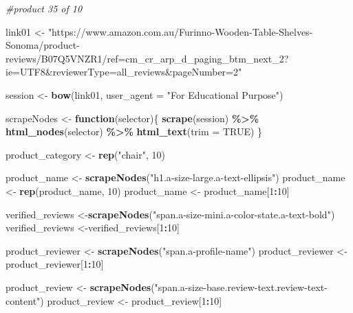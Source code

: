 \documentclass[
]{article}
\newenvironment{Shaded}{\begin{snugshade}}{\end{snugshade}}
\newcommand{\AttributeTok}[1]{\textcolor[rgb]{0.13,0.29,0.53}{#1}}
\newcommand{\CommentTok}[1]{\textcolor[rgb]{0.56,0.35,0.01}{\textit{#1}}}
\newcommand{\ConstantTok}[1]{\textcolor[rgb]{0.56,0.35,0.01}{#1}}
\newcommand{\ControlFlowTok}[1]{\textcolor[rgb]{0.13,0.29,0.53}{\textbf{#1}}}
\newcommand{\DecValTok}[1]{\textcolor[rgb]{0.00,0.00,0.81}{#1}}
\newcommand{\FunctionTok}[1]{\textcolor[rgb]{0.13,0.29,0.53}{\textbf{#1}}}
\newcommand{\NormalTok}[1]{#1}
\newcommand{\OtherTok}[1]{\textcolor[rgb]{0.56,0.35,0.01}{#1}}
\newcommand{\SpecialCharTok}[1]{\textcolor[rgb]{0.81,0.36,0.00}{\textbf{#1}}}
\newcommand{\StringTok}[1]{\textcolor[rgb]{0.31,0.60,0.02}{#1}}
\begin{document}
\begin{Shaded}
\begin{Highlighting}[]
\CommentTok{\#product 35 of 10}

\NormalTok{link01 }\OtherTok{\textless{}{-}} \StringTok{"https://www.amazon.com.au/Furinno{-}Wooden{-}Table{-}Shelves{-}Sonoma/product{-}reviews/B07Q5VNZR1/ref=cm\_cr\_arp\_d\_paging\_btm\_next\_2?ie=UTF8\&reviewerType=all\_reviews\&pageNumber=2"}


\NormalTok{  session }\OtherTok{\textless{}{-}} \FunctionTok{bow}\NormalTok{(link01,}
               \AttributeTok{user\_agent =} \StringTok{"For Educational Purpose"}\NormalTok{)}

\NormalTok{  scrapeNodes }\OtherTok{\textless{}{-}} \ControlFlowTok{function}\NormalTok{(selector)\{}
    \FunctionTok{scrape}\NormalTok{(session) }\SpecialCharTok{\%\textgreater{}\%}
      \FunctionTok{html\_nodes}\NormalTok{(selector) }\SpecialCharTok{\%\textgreater{}\%}
      \FunctionTok{html\_text}\NormalTok{(}\AttributeTok{trim =} \ConstantTok{TRUE}\NormalTok{)}
\NormalTok{  \}}

\NormalTok{  product\_category }\OtherTok{\textless{}{-}} \FunctionTok{rep}\NormalTok{(}\StringTok{"chair"}\NormalTok{, }\DecValTok{10}\NormalTok{)}

\NormalTok{  product\_name }\OtherTok{\textless{}{-}} \FunctionTok{scrapeNodes}\NormalTok{(}\StringTok{"h1.a{-}size{-}large.a{-}text{-}ellipsis"}\NormalTok{)}
\NormalTok{  product\_name }\OtherTok{\textless{}{-}} \FunctionTok{rep}\NormalTok{(product\_name, }\DecValTok{10}\NormalTok{)}
\NormalTok{  product\_name }\OtherTok{\textless{}{-}}\NormalTok{ product\_name[}\DecValTok{1}\SpecialCharTok{:}\DecValTok{10}\NormalTok{]}
  
\NormalTok{  verified\_reviews }\OtherTok{\textless{}{-}}\FunctionTok{scrapeNodes}\NormalTok{(}\StringTok{"span.a{-}size{-}mini.a{-}color{-}state.a{-}text{-}bold"}\NormalTok{)}
\NormalTok{  verified\_reviews }\OtherTok{\textless{}{-}}\NormalTok{verified\_reviews[}\DecValTok{1}\SpecialCharTok{:}\DecValTok{10}\NormalTok{]}
  
\NormalTok{  product\_reviewer }\OtherTok{\textless{}{-}} \FunctionTok{scrapeNodes}\NormalTok{(}\StringTok{"span.a{-}profile{-}name"}\NormalTok{)}
\NormalTok{  product\_reviewer }\OtherTok{\textless{}{-}}\NormalTok{ product\_reviewer[}\DecValTok{1}\SpecialCharTok{:}\DecValTok{10}\NormalTok{]}
  
\NormalTok{  product\_review }\OtherTok{\textless{}{-}} \FunctionTok{scrapeNodes}\NormalTok{(}\StringTok{"span.a{-}size{-}base.review{-}text.review{-}text{-}content"}\NormalTok{)}
\NormalTok{  product\_review }\OtherTok{\textless{}{-}}\NormalTok{ product\_review[}\DecValTok{1}\SpecialCharTok{:}\DecValTok{10}\NormalTok{]}
  

\end{Highlighting}
\end{Shaded}
\end{document}
